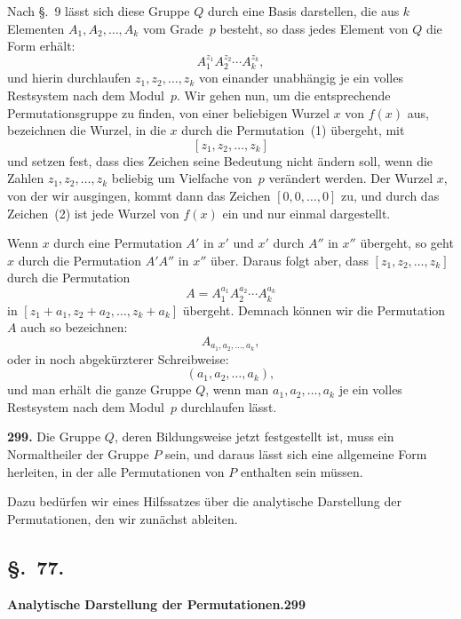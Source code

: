 \documentclass[12pt,a4paper]{article}
\begin{document}
Nach \S.~9 l\"asst sich diese Gruppe $Q$ durch eine Basis darstellen, die aus $k$ Elementen $A_1,A_2,\ldots,A_k$ vom Grade~$p$ besteht, so dass jedes Element von $Q$ die Form erh\"alt:
\begin{equation}
\tag{1}
A_1^{z_1} A_2^{z_2} \cdots A_k^{z_k},
\end{equation}
und hierin durchlaufen $z_1,z_2,\ldots,z_k$ von einander unabh\"angig je ein volles Restsystem nach dem Modul~$p$. Wir gehen nun, um die entsprechende Permutationsgruppe zu finden, von einer beliebigen Wurzel $x$ von $f(x)$ aus, bezeichnen die Wurzel, in die $x$ durch die Permutation~(1) \"ubergeht, mit
\begin{equation}
\tag{2}
[z_1,z_2,\ldots,z_k]
\end{equation}
und setzen fest, dass dies Zeichen seine Bedeutung nicht \"andern soll, wenn die Zahlen $z_1,z_2,\ldots,z_k$ beliebig um Vielfache von~$p$ ver\"andert werden. Der Wurzel $x$, von der wir ausgingen, kommt dann das Zeichen $[0,0,\ldots,0]$ zu, und durch das Zeichen~(2) ist jede Wurzel von $f(x)$ ein und nur einmal dargestellt.

Wenn $x$ durch eine Permutation $A'$ in $x'$ und $x'$ durch $A''$ in $x''$ \"ubergeht, so geht $x$ durch die Permutation $A'A''$ in $x''$ \"uber. Daraus folgt aber, dass $[z_1,z_2,\ldots,z_k]$ durch die Permutation
\begin{equation}
\tag{3}
A = A_1^{a_1} A_2^{a_2} \cdots A_k^{a_k}
\end{equation}
in $[z_1+a_1, z_2+a_2, \ldots, z_k+a_k]$ \"ubergeht. Demnach k\"onnen wir die Permutation $A$ auch so bezeichnen:
\[
A_{a_1,a_2,\ldots,a_k},
\]
oder in noch abgek\"urzterer Schreibweise:
\begin{equation}
\tag{4}
(a_1,a_2,\ldots,a_k),
\end{equation}
und man erh\"alt die ganze Gruppe $Q$, wenn man $a_1,a_2,\ldots,a_k$ je ein volles Restsystem nach dem Modul~$p$ durchlaufen l\"asst.

\bigskip
\noindent\textbf{299.} Die Gruppe $Q$, deren Bildungsweise jetzt festgestellt ist, muss ein Normaltheiler der Gruppe $P$ sein, und daraus l\"asst sich eine allgemeine Form herleiten, in der alle Permutationen von $P$ enthalten sein m\"ussen.

Dazu bed\"urfen wir eines Hilfssatzes \"uber die analytische Darstellung der Permutationen, den wir zun\"achst ableiten.

\subsection*{\S.~77.}
\textbf{Analytische Darstellung der Permutationen.}\hfill\textbf{299}\\[4pt]
\end{document}
